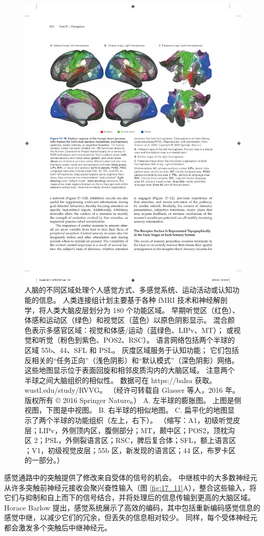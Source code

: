 \begin{figure}[htbp]
	\centering
	\includegraphics[width=0.7\linewidth]{chap17/fig_17_10}
	\caption{人脑的不同区域处理个人感觉方式、多感觉系统、运动活动或认知功能的信息。
		人类连接组计划主要基于各种 fMRI 技术和神经解剖学，将人类大脑皮层划分为 180 个功能区域。 
		早期听觉区（红色）、体感和运动区（绿色）和视觉区（蓝色）以原色阴影显示。 
		混合颜色表示多感官区域：视觉和体感/运动（蓝绿色、LIPv、MT）； 或视觉和听觉（粉色到紫色、POS2、RSC）。 
		语言网络包括两个半球的区域 55b、44、SFL 和 PSL。 
		灰度区域服务于认知功能； 它们包括反相关的“任务正向”（浅色阴影）和“默认模式”（深色阴影）网络。 
		这些地图显示位于表面回旋和相邻皮质沟内的大脑区域。 
		注意两个半球之间大脑组织的相似性。 数据可在 https://balsa 获取。 wustl.edu/study/RVVG。 （经许可转载自 Glasser 等人，2016 年。版权所有 © 2016 Springer Nature。）
		A. 左半球的膨胀图。 上图是侧视图，下图是中视图。 
		B. 右半球的相似地图。 
		C. 扁平化的地图显示了两个半球的功能组织（左上，右下）。 
		（缩写：A1，初级听觉皮层；LIPv，外侧顶内区，腹侧部分；MT，颞中区；POS2，顶枕沟区 2；PSL，外侧裂语言区；RSC，脾后复合体；SFL，额上语言区 ；V1，初级视觉皮层；55b 区，新发现的语言区；44 区，布罗卡区的一部分。）}
	\label{fig:17_10}
\end{figure}

感觉通路中的突触提供了修改来自受体的信号的机会。 
中继核中的大多数神经元从许多突触前神经元接收会聚兴奋性输入（图 \ref{fig:17_11}A），整合这些输入，将它们与抑制和自上而下的信号结合，并将处理后的信息传输到更高的大脑区域。 
Horace Barlow 提出，感觉系统展示了高效的编码，其中包括重新编码感觉信息的感觉中继，以减少它们的冗余，但丢失的信息相对较少。 
同样，每个受体神经元都会激发多个突触后中继神经元。

